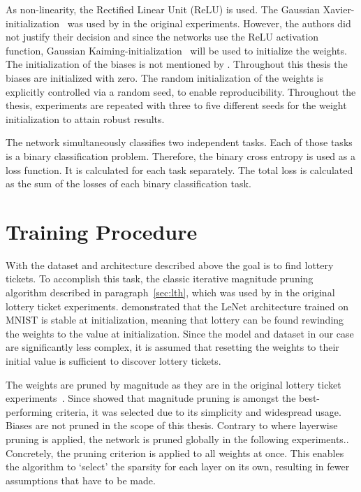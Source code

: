 As non-linearity, the Rectified Linear Unit (ReLU) is used.
The Gaussian Xavier-initialization~\textcite{XAVIER-GLOROT} was used by \textcite{LTH} in the original experiments.
However, the authors did not justify their decision and since the networks use the ReLU activation function, Gaussian Kaiming-initialization~\autocite{KAIMING-HE} will be used to initialize the weights.
The initialization of the biases is not mentioned by \textcite{LTH}.
Throughout this thesis the biases are initialized with zero.
The random initialization of the weights is explicitly controlled via a random seed, to enable reproducibility.
Throughout the thesis, experiments are repeated with three to five different seeds for the weight initialization to attain robust results.

The network simultaneously classifies two independent tasks.
Each of those tasks is a binary classification problem.
Therefore, the binary cross entropy is used as a loss function.
It is calculated for each task separately.
The total loss is calculated as the sum of the losses of each binary classification task. 

\section{Training Procedure}
With the dataset and architecture described above the goal is to find lottery tickets.
To accomplish this task, the classic iterative magnitude pruning algorithm described in paragraph~\ref{sec:lth}, which was used by \textcite{LTH} in the original lottery ticket experiments.
\textcite{LinearModeConnectivity} demonstrated that the LeNet architecture trained on MNIST is stable at initialization, meaning that lottery can be found rewinding the weights to  the value at initialization. 
Since the model and dataset in our case are significantly less complex, it is assumed that resetting the weights to their initial value is sufficient to discover lottery tickets.

The weights are pruned by magnitude as they are in the original lottery ticket experiments~\autocite{LTH}. 
Since \autocite{Supermasks} showed that magnitude pruning is amongst the best-performing criteria, it was selected due to its simplicity and widespread usage.
Biases are not pruned in the scope of this thesis.
Contrary to \autocite{LTH} where layerwise pruning is applied, the network is pruned globally in the following experiments..
Concretely, the pruning criterion is applied to all weights at once.
This enables the algorithm to `select' the sparsity for each layer on its own, resulting in fewer assumptions that have to be made.


